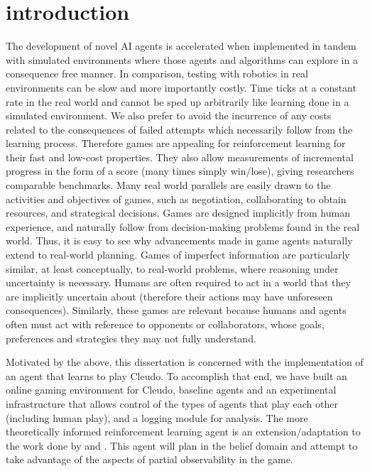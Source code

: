 \documentclass[msc, deptreport, ai, romanprepages]{infthesis}
\begin{document}
\chapter{introduction}
The development of novel AI agents is accelerated when implemented in tandem with simulated environments where those agents and algorithms can explore in a consequence free manner. In comparison, testing with robotics in real environments can be slow and more importantly costly. Time ticks at a constant rate in the real world and cannot be sped up arbitrarily like learning done in a simulated environment. We also prefer to avoid the incurrence of any costs related to the consequences of failed attempts which necessarily follow from the learning process. Therefore games are appealing for reinforcement learning for their fast and low-cost properties. They also allow measurements of incremental progress in the form of a score (many times simply win/lose), giving researchers comparable benchmarks. Many real world parallels are easily drawn to the activities and objectives of games, such as negotiation, collaborating to obtain resources, and strategical decisions. Games are designed implicitly from human experience, and naturally follow from decision-making problems found in the real world. Thus, it is easy to see why advancements made in game agents naturally extend to real-world planning. Games of imperfect information are particularly similar, at least conceptually, to real-world problems, where reasoning under uncertainty is necessary. Humans are often required to act in a world that they are implicitly uncertain about (therefore their actions may have unforeseen consequences). Similarly, these games are relevant because humans and agents often must act with reference to opponents or collaborators, whose goals, preferences and strategies they may not fully understand. 

Motivated by the above, this dissertation is concerned with the implementation of an agent that learns to play Cleudo. To accomplish that end, we have built an online gaming environment for Cleudo, baseline agents and an experimental infrastructure that allows control of the types of agents that play each other (including human play), and a logging module for analysis. The more theoretically informed reinforcement learning agent is an extension/adaptation to the work done by \cite{Silver-veness} and \cite{Mihai}. This agent will plan in the belief domain and attempt to take advantage of the aspects of partial observability in the game. 
\end{document}
